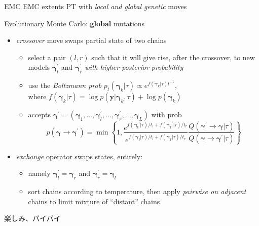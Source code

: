 \documentclass{beamer}
\newcommand{\vect}[1]{\boldsymbol{#1}}
\begin{document}
\begin{frame}{EMC}
EMC extents PT with \emph{local and global genetic} moves
\begin{block}{Evolutionary Monte Carlo: \textbf{global} mutations}
    \begin{itemize}
        \item \emph{crossover} move swaps partial state of two chains
            \begin{itemize}
                \item select a pair $(l, r)$ such that it will give rise, after
                the crossover, to new models $\vect{\gamma}_{l}^{\prime}$
                and $\vect{\gamma}_{r}^{\prime}$ \emph{with higher posterior probability}
                \item use the \emph{Boltzmann prob} $p_{t}(\vect{\gamma}_{k}|\tau) \propto e^{f(\vect{\gamma}_{k}|\tau)t^{-1}}$,\\
                where $f(\vect{\gamma}_{k}|\tau)=\log{p(\vect{y}|\vect{\gamma}_{k},\tau)}+\log{p(\vect{\gamma}_{k})}$
                \item accepts $\vect{\gamma}^{\prime}=(\vect{\gamma}_{1},\ldots,
                \vect{\gamma}_{l}^{\prime},\ldots, \vect{\gamma}_{r}^{\prime},\ldots,
                \vect{\gamma}_{L})$ with prob
                \begin{displaymath}
                    p(\vect{\gamma}\rightarrow\vect{\gamma}^{\prime}) = \min{ \left\lbrace 1,
                    \frac{e^{f(\vect{\gamma_{l}}^{\prime}|\tau)/t_{l}+f(\vect{\gamma_{r}}^{\prime}|\tau)/t_{r}}}
                         {e^{f(\vect{\gamma_{l}}|\tau)/t_{l}+f(\vect{\gamma_{r}}|\tau)/t_{r}}}
                    \frac{Q(\vect{\gamma}^{\prime}\rightarrow\vect{\gamma}|\tau)}
                         {Q(\vect{\gamma}\rightarrow\vect{\gamma}^{\prime}|\tau)}
                    \right\rbrace}
                \end{displaymath}
            \end{itemize}
        \item \emph{exchange} operator swaps states, entirely: 
            \begin{itemize}
                \item namely $\vect{\gamma}_{l}^{\prime} = \vect{\gamma}_{r}$
                and $\vect{\gamma}_{r}^{\prime} = \vect{\gamma}_{l}$
                \item sort chains according to temperature, then apply
                \emph{pairwise on adjacent} chains to limit mixture of ``distant'' chains
            \end{itemize}
    \end{itemize}
\end{block}
\end{frame}
  

\begin{frame}{ }
\Huge
\begin{CJK}{UTF8}{min}
楽しみ、バイバイ
\end{CJK}
\end{frame}
\end{document}
